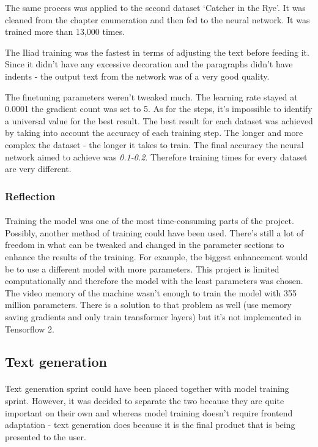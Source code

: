 \documentclass[12pt]{report}
\begin{document}
The same process was applied to the second dataset `Catcher in the Rye'. It was cleaned from the chapter enumeration and
then fed to the neural network. It was trained more than 13,000 times.

The Iliad training was the fastest in terms of adjusting the text before feeding it. Since it didn't have any excessive
decoration and the paragraphs didn't have indents - the output text from the network was of a very good quality.

The finetuning parameters weren't tweaked much. The learning rate stayed at 0.0001 the gradient count was set to
5. As for the steps, it's impossible to identify a universal value for the best result. The best result for each
dataset was achieved by taking into account the accuracy of each training step. The longer and more complex the dataset -
the longer it takes to train. The final accuracy the neural network aimed to achieve was \textit{0.1-0.2}. Therefore
training times for every dataset are very different.

\subsubsection*{Reflection}
\paragraph{}
Training the model was one of the most time-consuming parts of the project. Possibly, another method of training could
have been used. There's still a lot of freedom in what can be tweaked and changed in the parameter sections to
enhance the results of the training. For example, the biggest enhancement would be to use a different model with more
parameters. This project is limited computationally and therefore the model with the least parameters was chosen. The video
memory of the machine wasn't enough to train the model with 355 million parameters. There is a solution to that problem
as well (use memory saving gradients and only train transformer layers) but it's not implemented in Tensorflow 2.

\clearpage 

\subsection*{Text generation}
\paragraph{}
Text generation sprint could have been placed together with model training sprint. However, it was decided to separate
the two because they are quite important on their own and whereas model training doesn't require frontend adaptation -
text generation does because it is the final product that is being presented to the user.
\end{document}
